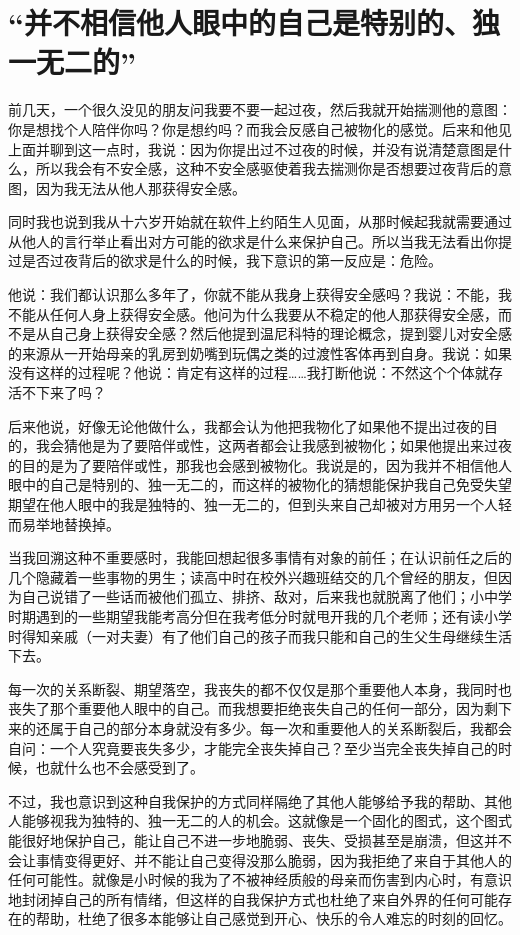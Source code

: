 \chapter{“并不相信他人眼中的自己是特别的、独一无二的”}





前几天，一个很久没见的朋友问我要不要一起过夜，然后我就开始揣测他的意图：你是想找个人陪伴你吗？你是想约吗？而我会反感自己被物化的感觉。后来和他见上面并聊到这一点时，我说：因为你提出过不过夜的时候，并没有说清楚意图是什么，所以我会有不安全感，这种不安全感驱使着我去揣测你是否想要过夜背后的意图，因为我无法从他人那获得安全感。

同时我也说到我从十六岁开始就在软件上约陌生人见面，从那时候起我就需要通过从他人的言行举止看出对方可能的欲求是什么来保护自己。所以当我无法看出你提过是否过夜背后的欲求是什么的时候，我下意识的第一反应是：危险。

他说：我们都认识那么多年了，你就不能从我身上获得安全感吗？我说：不能，我不能从任何人身上获得安全感。他问为什么我要从不稳定的他人那获得安全感，而不是从自己身上获得安全感？然后他提到温尼科特的理论概念，提到婴儿对安全感的来源从一开始母亲的乳房到奶嘴到玩偶之类的过渡性客体再到自身。我说：如果没有这样的过程呢？他说：肯定有这样的过程……我打断他说：不然这个个体就存活不下来了吗？

后来他说，好像无论他做什么，我都会认为他把我物化了\pozhehao{}如果他不提出过夜的目的，我会猜他是为了要陪伴或性，这两者都会让我感到被物化；如果他提出来过夜的目的是为了要陪伴或性，那我也会感到被物化。我说是的，因为我并不相信他人眼中的自己是特别的、独一无二的，而这样的被物化的猜想能保护我自己免受失望\pozhehao{}期望在他人眼中的我是独特的、独一无二的，但到头来自己却被对方用另一个人轻而易举地替换掉。

当我回溯这种不重要感时，我能回想起很多事情\pozhehao{}有对象的前任；在认识前任之后的几个隐藏着一些事物的男生；读高中时在校外兴趣班结交的几个曾经的朋友，但因为自己说错了一些话而被他们孤立、排挤、敌对，后来我也就脱离了他们；小中学时期遇到的一些期望我能考高分但在我考低分时就甩开我的几个老师；还有读小学时得知亲戚（一对夫妻）有了他们自己的孩子而我只能和自己的生父生母继续生活下去。

每一次的关系断裂、期望落空，我丧失的都不仅仅是那个重要他人本身，我同时也丧失了那个重要他人眼中的自己。而我想要拒绝丧失自己的任何一部分，因为剩下来的还属于自己的部分本身就没有多少。每一次和重要他人的关系断裂后，我都会自问：一个人究竟要丧失多少，才能完全丧失掉自己？至少当完全丧失掉自己的时候，也就什么也不会感受到了。

不过，我也意识到这种自我保护的方式同样隔绝了其他人能够给予我的帮助、其他人能够视我为独特的、独一无二的人的机会。这就像是一个固化的图式，这个图式能很好地保护自己，能让自己不进一步地脆弱、丧失、受损甚至是崩溃，但这并不会让事情变得更好、并不能让自己变得没那么脆弱，因为我拒绝了来自于其他人的任何可能性。就像是小时候的我为了不被神经质般的母亲而伤害到内心时，有意识地封闭掉自己的所有情绪，但这样的自我保护方式也杜绝了来自外界的任何可能存在的帮助，杜绝了很多本能够让自己感觉到开心、快乐的令人难忘的时刻的回忆。


